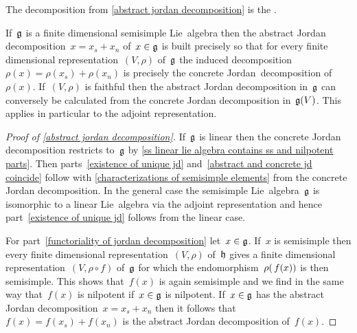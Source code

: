 \begin{definition}
  The decomposition from \cref{abstract jordan decomposition} is the .
\end{definition}


\begin{remark}
  If~$\mathfrak{g}$ is a finite dimensional semisimple Lie~algebra then the abstract Jordan decomposition~$x = x_s + x_n$ of~$x \in \mathfrak{g}$ is built precisely so that for every finite dimensional representation~$(V,\rho)$ of~$\mathfrak{g}$ the induced decomposition~$\rho(x) = \rho(x_s) + \rho(x_n)$ is precisely the concrete Jordan~decomposition of~$\rho(x)$.
  If~$(V,\rho)$ is faithful then the abstract Jordan decomposition in~$\mathfrak{g}$ can conversely be calculated from the concrete Jordan decomposition in~$\mathfrak{g}(V)$.
  This applies in particular to the adjoint representation.
\end{remark}

\begin{proof}[Proof of \cref{abstract jordan decomposition}]
  If~$\mathfrak{g}$ is linear then the concrete Jordan decomposition restricts to~$\mathfrak{g}$ by \cref{ss linear lie algebra contains ss and nilpotent parts}.
  Then parts~\ref*{existence of unique jd} and~\ref*{abstract and concrete jd coincide} follow with \cref{characterizations of semisimple elements} from the concrete Jordan decomposition.
  In the general case the semisimple Lie~algebra~$\mathfrak{g}$ is isomorphic to a linear Lie~algebra via the adjoint representation and hence part~\ref*{existence of unique jd} follows from the linear case.
  
  For part~\ref*{functoriality of jordan decomposition} let~$x \in \mathfrak{g}$.
  If~$x$ is semisimple then every finite dimensional representation~$(V, \rho)$ of~$\mathfrak{h}$ gives a finite dimensional representation~$(V, \rho \circ f)$ of~$\mathfrak{g}$ for which the endomorphism~$\rho(\, f(x))$ is then semisimple.
  This shows that~$f(x)$ is again semisimple and we find in the same way that~$f(x)$ is nilpotent if~$x \in \mathfrak{g}$ is nilpotent.
  If~$x \in \mathfrak{g}$ has the abstract Jordan decomposition~$x = x_s + x_n$ then it follows that~$f(x) = f(x_s) + f(x_n)$ is the abstract Jordan decomposition of~$f(x)$.
\end{proof}


